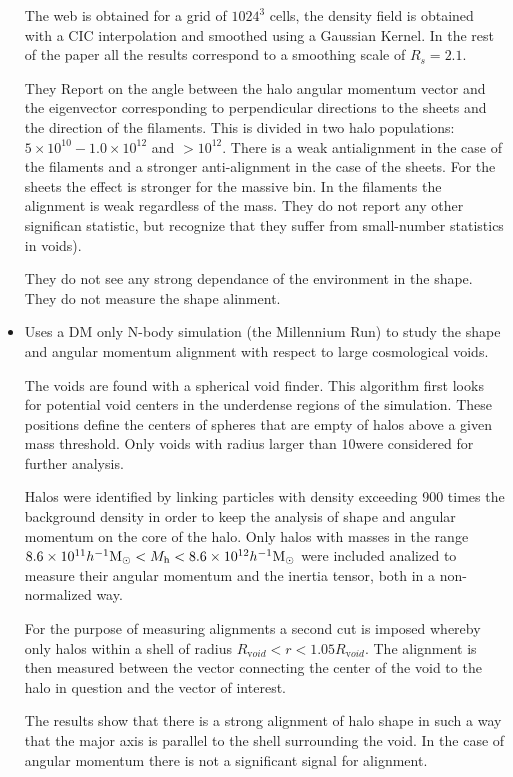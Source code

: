 \documentclass[useAMS,usenatbib]{mn2e}
\newcommand{\hMpc}{{\ifmmode{h^{-1}{\rm Mpc}}\else{$h^{-1}$Mpc }\fi}}
\newcommand{\hMsun}{{\ifmmode{h^{-1}{\rm
        {M_{\odot}}}}\else{$h^{-1}{\rm{M_{\odot}}}$}\fi}}
\begin{document}
\begin{itemize}
The web is obtained for a grid of $1024^3$ cells, the density field is
obtained with a CIC interpolation and smoothed using a Gaussian
Kernel. In the rest of the paper all the results correspond to a
smoothing scale of $R_{s}=2.1$\hMpc.


They Report on the angle between the halo
angular momentum vector and the eigenvector corresponding to
perpendicular directions to the sheets and the direction of the
filaments. This is divided in two halo populations: $5\times 10^{10} -
1.0\times 10^{12}$ and $>10^{12}$. There is a weak antialignment in
the case of the filaments and a stronger anti-alignment in the case of
the sheets. For the sheets the effect is stronger for the massive
bin. In the filaments the alignment is weak regardless of the
mass. They do not report any other significan statistic, but recognize
that they suffer from small-number statistics in voids).


They do not see any strong dependance of the environment in the
shape. They do not measure the shape alinment.

\item
\citep{Brunino2007}
Uses a DM only N-body simulation (the Millennium Run) to study the
shape and angular momentum alignment with respect to large
cosmological voids. 

The voids are found with a spherical void finder. This algorithm first
looks for potential void centers in the underdense regions of the
simulation. These positions define the centers of spheres that are
empty of halos above a given mass threshold. Only voids with radius
larger than $10$\hMpc were considered for further analysis.

Halos were identified by linking particles with density exceeding 900
times the background density in order to keep the analysis of shape
and angular momentum on the core of the halo. Only halos with masses
in the range $8.6\times 10^{11}\hMsun < M_{\mathrm h}< 8.6\times
10^{12}\hMsun$ were included analized to measure their angular
momentum and the inertia tensor, both in a non-normalized way.

For the purpose of measuring alignments a second cut is imposed
whereby only halos within a shell of radius $R_{\mathrm void}<r<1.05R_{\mathrm
void}$. The alignment is then measured between the vector connecting
the center of the void to the halo in question and the vector of
interest.

The results show that there is a strong alignment of halo shape in
such a way that the major axis is parallel to the shell surrounding
the void. In the case of angular momentum there is not a significant
signal for alignment.





\end{itemize}
\end{document}
